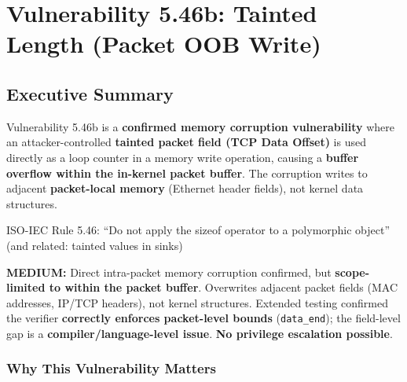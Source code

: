 \chapter{\texorpdfstring{Vulnerability 5.46b: Tainted\\Length (Packet OOB Write)}{Vulnerability 5.46b: Tainted Length (Packet OOB Write)}}

\section{Executive Summary}

Vulnerability 5.46b is a \textbf{confirmed memory corruption vulnerability} where an attacker-controlled \textbf{tainted packet field (TCP Data Offset)} is used directly as a loop counter in a memory write operation, causing a \textbf{buffer overflow within the in-kernel packet buffer}. The corruption writes to adjacent \textbf{packet-local memory} (Ethernet header fields), not kernel data structures.

\begin{tcolorbox}[colback=blue!5!white,colframe=blue!75!black,title=ISO Rule Violated,fonttitle=\bfseries]
ISO-IEC Rule 5.46: ``Do not apply the sizeof operator to a polymorphic object'' (and related: tainted values in sinks)
\end{tcolorbox}

\begin{tcolorbox}[colback=red!5!white,colframe=red!75!black,title=Severity,fonttitle=\bfseries]
\textbf{MEDIUM:} Direct intra-packet memory corruption confirmed, but \textbf{scope-limited to within the packet buffer}. Overwrites adjacent packet fields (MAC addresses, IP/TCP headers), not kernel structures. Extended testing confirmed the verifier \textbf{correctly enforces packet-level bounds} (\texttt{data\_end}); the field-level gap is a \textbf{compiler/language-level issue}. \textbf{No privilege escalation possible}.
\end{tcolorbox}

\subsection{Why This Vulnerability Matters}

